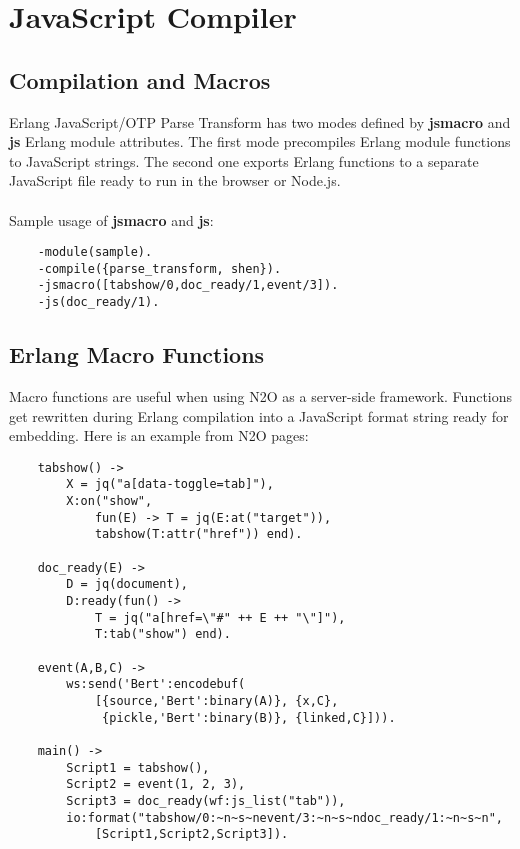 \section{JavaScript Compiler}

\subsection{Compilation and Macros}
Erlang JavaScript/OTP Parse Transform has two modes defined
by {\bf \-jsmacro} and {\bf \-js} Erlang module attributes.
The first mode precompiles Erlang module functions
to JavaScript strings. The second one exports Erlang functions
to a separate JavaScript file ready to run in the browser or Node.js.

\paragraph{}
Sample usage of {\bf \-jsmacro} and {\bf \-js}:

\begin{lstlisting}
    -module(sample).
    -compile({parse_transform, shen}).
    -jsmacro([tabshow/0,doc_ready/1,event/3]).
    -js(doc_ready/1).
\end{lstlisting}

\subsection{Erlang Macro Functions}
Macro functions are useful when using N2O as a server-side framework.
Functions get rewritten during Erlang compilation into a JavaScript format
string ready for embedding. Here is an example from N2O pages:

\begin{lstlisting}
    tabshow() ->
        X = jq("a[data-toggle=tab]"),
        X:on("show", 
            fun(E) -> T = jq(E:at("target")),
            tabshow(T:attr("href")) end).

    doc_ready(E) ->
        D = jq(document),
        D:ready(fun() ->
            T = jq("a[href=\"#" ++ E ++ "\"]"),
            T:tab("show") end).

    event(A,B,C) ->
        ws:send('Bert':encodebuf(
            [{source,'Bert':binary(A)}, {x,C},
             {pickle,'Bert':binary(B)}, {linked,C}])).

    main() ->
        Script1 = tabshow(),
        Script2 = event(1, 2, 3),
        Script3 = doc_ready(wf:js_list("tab")),
        io:format("tabshow/0:~n~s~nevent/3:~n~s~ndoc_ready/1:~n~s~n",
            [Script1,Script2,Script3]).
\end{lstlisting}

